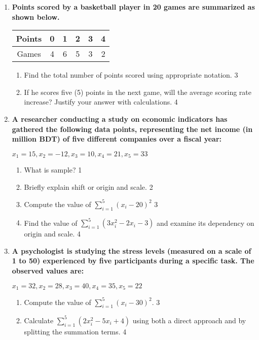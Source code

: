 \documentclass[a4paper,oneside]{book}
\begin{document}
\begin{enumerate}
  \item
\textbf{Points scored by a basketball player in 20 games are summarized as shown below.}

\begin{table}[h]
\centering
\begin{tabular}{|c|ccccc|}
Points & 0 & 1 & 2 & 3 & 4 \\ \hline
Games  & 4 & 6 & 5 & 3 & 2
\end{tabular}
\end{table}

\begin{enumerate}
    \item  
    Find the total number of points scored using appropriate notation. \hfill 3
    \item
    If he scores five (5) points in the next game, will the average scoring rate increase? Justify your answer with calculations. \hfill 4
\end{enumerate}

  
    \item  
	  \textbf{A researcher conducting a study on economic indicators has gathered the following data points, representing the net income (in million BDT) of five different companies over a fiscal year:}  
	  
	  \begin{center}  
	  $x_1=15, x_2=-12, x_3=10, x_4=21, x_5=33$  
	  \end{center} 
  \begin{enumerate}
    \item
	What is sample? \hfill 1
    \item
	Briefly explain shift or origin and scale. \hfill 2
    \item  
	Compute the value of $\displaystyle \sum_{i=1}^5 (x_i-20)^2$ \hfill 3
    \item
	Find the value of $\displaystyle \sum_{i=1}^5 (3x_i^2-2x_i-3)$ and examine its dependency on origin and scale. \hfill 4
  \end{enumerate} 
  
  \item
\textbf{A psychologist is studying the stress levels (measured on a scale 
of 1 to 50) experienced by five participants during a specific task. 
The observed values are:}
\begin{center}
$x_1 = 32, x_2 = 28, x_3 = 40, x_4 = 35, x_5 = 22$
\end{center}
\begin{enumerate}
    \item
    Compute the value of $\displaystyle \sum_{i=1}^5 (x_i - 30)^2$. \hfill 3
    \item
    Calculate $\displaystyle \sum_{i=1}^5 (2x_i^2 - 5x_i + 4)$ using both a direct approach and by splitting the summation terms. \hfill 4
\end{enumerate}



\end{enumerate}
\end{document}
